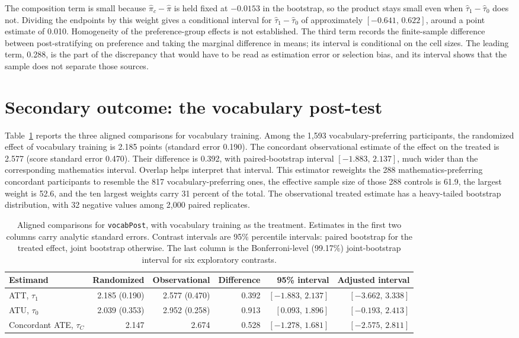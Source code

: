 \documentclass[twoside,11pt]{article}
\begin{document}
The composition term is small because $\widehat\pi_c-\widehat\pi$ is held fixed at $-0.0153$ in the bootstrap, so the product stays small even when $\widehat\tau_1-\widehat\tau_0$ does not. Dividing the endpoints by this weight gives a conditional interval for $\widehat\tau_1-\widehat\tau_0$ of approximately $[-0.641,\,0.622]$, around a point estimate of 0.010. Homogeneity of the preference-group effects is not established. The third term records the finite-sample difference between post-stratifying on preference and taking the marginal difference in means; its interval is conditional on the cell sizes. The leading term, 0.288, is the part of the discrepancy that would have to be read as estimation error or selection bias, and its interval shows that the sample does not separate those sources.

\section{Secondary outcome: the vocabulary post-test}
\label{sec:vocab}

Table~\ref{tab:vocab} reports the three aligned comparisons for vocabulary training. Among the 1{,}593 vocabulary-preferring participants, the randomized effect of vocabulary training is 2.185 points (standard error 0.190). The concordant observational estimate of the effect on the treated is 2.577 (score standard error 0.470). Their difference is 0.392, with paired-bootstrap interval $[-1.883,\,2.137]$, much wider than the corresponding mathematics interval. Overlap helps interpret that interval. This estimator reweights the 288 mathematics-preferring concordant participants to resemble the 817 vocabulary-preferring ones, the effective sample size of those 288 controls is 61.9, the largest weight is 52.6, and the ten largest weights carry 31 percent of the total. The observational treated estimate has a heavy-tailed bootstrap distribution, with 32 negative values among 2{,}000 paired replicates.

\begin{table}[htbp]
\centering
\caption{Aligned comparisons for \texttt{vocabPost}, with vocabulary training as the treatment. Estimates in the first two columns carry analytic standard errors. Contrast intervals are 95\% percentile intervals: paired bootstrap for the treated effect, joint bootstrap otherwise. The last column is the Bonferroni-level (99.17\%) joint-bootstrap interval for six exploratory contrasts.}
\label{tab:vocab}
\small
\setlength{\tabcolsep}{3.3pt}
\begin{tabular}{lrrrrr}
\toprule
Estimand & Randomized & Observational & Difference & 95\% interval & Adjusted interval \\
\midrule
ATT, $\tau_1$ & 2.185 (0.190) & 2.577 (0.470) & 0.392 & $[-1.883,\,2.137]$ & $[-3.662,\,3.338]$ \\
ATU, $\tau_0$ & 2.039 (0.353) & 2.952 (0.258) & 0.913 & $[0.093,\,1.896]$ & $[-0.193,\,2.413]$ \\
Concordant ATE, $\tau_C$ & 2.147 & 2.674 & 0.528 & $[-1.278,\,1.681]$ & $[-2.575,\,2.811]$ \\
\bottomrule
\end{tabular}
\end{table}
\end{document}
